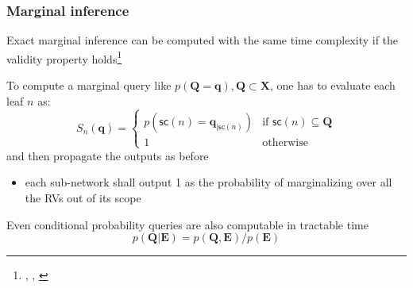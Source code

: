 \documentclass[10pt, t, xcolor={usenames,dvipsnames,svgnames}, compress]{beamer}
\newcommand{\customcite}[1]{\footnote{\scriptsize \citeauthor{#1}, \citetitle{#1}, \citeyear{#1}}}
\begin{document}
\begin{frame}
  \frametitle{Marginal inference}

Exact marginal inference can be computed with the same time complexity if the
validity property holds\customcite{Poon2011}

To compute a marginal query like $p(\mathbf{Q=q}),
\mathbf{Q}\subset\mathbf{X}$, one has to evaluate each leaf $n$ as:
\begin{equation}
  \label{eq:marg}
  S_{n}(\mathbf{q}) = \begin{cases}
    p(\mathsf{sc}(n) =\mathbf{q}_{|\mathsf{sc}(n)}) & \text{if $\mathsf{sc}(n)\subseteq\mathbf{Q}$} \\
    1 & \text{otherwise}
  \end{cases}
\end{equation}
and then propagate the outputs as before

\begin{itemize}
\item each sub-network shall output 1 as the probability of marginalizing
over all the RVs out of its scope
\end{itemize}

Even conditional probability queries are also computable
in tractable time
$$p(\mathbf{Q}|\mathbf{E}) = p(\mathbf{Q}, \mathbf{E})/p(\mathbf{E})$$

\end{frame}
\end{document}
